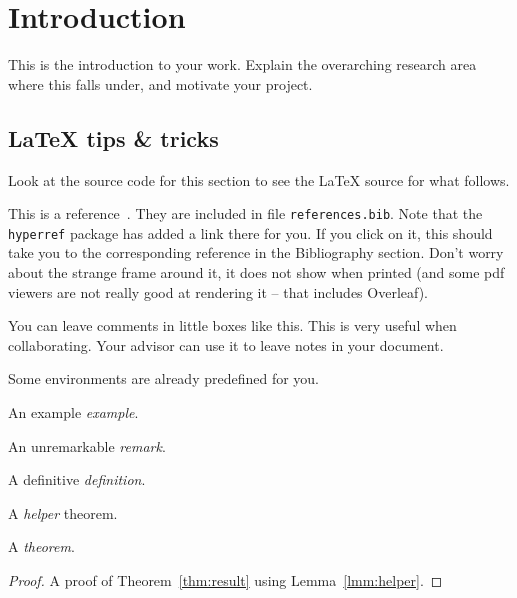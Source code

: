 \chapter{Introduction}
\label{chp:intro}

This is the introduction to your work. Explain the overarching 
research area where this falls under, and motivate your project.

\section{\LaTeX{} tips \& tricks}

Look at the source code for this section to see the \LaTeX{} source
for what follows.

This is a reference~\cite{turing1937}. They are included in file \texttt{references.bib}. Note that the \texttt{hyperref} package has added a link there for you. If you click on it, this should take you to the corresponding reference in the Bibliography section. Don't worry about the strange frame around it, it does not show when printed (and some pdf viewers are not really good at rendering it -- that includes Overleaf).

You can leave comments in little boxes like this. This is very useful when collaborating. Your advisor can use it to leave notes in your document.

Some environments are already predefined for you.

\begin{example}
An example \emph{example}.
\end{example}

\begin{remark}
An unremarkable \emph{remark}.
\end{remark}

\begin{definition}
A definitive \emph{definition}.
\end{definition}

\begin{lemma}
\label{lmm:helper}
A \emph{helper} theorem.
\end{lemma}

\begin{theorem}
\label{thm:result}
A \emph{theorem}.
\end{theorem}

\begin{proof}
A proof of Theorem~\ref{thm:result} using Lemma~\ref{lmm:helper}.
\end{proof}

